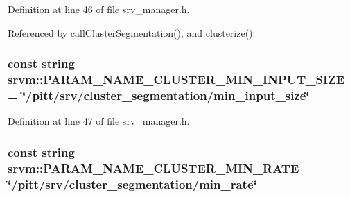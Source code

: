 Definition at line 46 of file srv\-\_\-manager.\-h.



Referenced by call\-Cluster\-Segmentation(), and clusterize().

\hypertarget{namespacesrvm_a3f21a743638bc9a2a5fbfbc5711e4095}{
\subsubsection[{P\-A\-R\-A\-M\-\_\-\-N\-A\-M\-E\-\_\-\-C\-L\-U\-S\-T\-E\-R\-\_\-\-M\-I\-N\-\_\-\-I\-N\-P\-U\-T\-\_\-\-S\-I\-Z\-E}]{\setlength{\rightskip}{0pt plus 5cm}const string srvm\-::\-P\-A\-R\-A\-M\-\_\-\-N\-A\-M\-E\-\_\-\-C\-L\-U\-S\-T\-E\-R\-\_\-\-M\-I\-N\-\_\-\-I\-N\-P\-U\-T\-\_\-\-S\-I\-Z\-E = \char`\"{}/pitt/srv/cluster\-\_\-segmentation/min\-\_\-input\-\_\-size\char`\"{}}}\label{namespacesrvm_a3f21a743638bc9a2a5fbfbc5711e4095}


Definition at line 47 of file srv\-\_\-manager.\-h.

\hypertarget{namespacesrvm_a68216326c13293ff70084f03bb4efa98}{
\subsubsection[{P\-A\-R\-A\-M\-\_\-\-N\-A\-M\-E\-\_\-\-C\-L\-U\-S\-T\-E\-R\-\_\-\-M\-I\-N\-\_\-\-R\-A\-T\-E}]{\setlength{\rightskip}{0pt plus 5cm}const string srvm\-::\-P\-A\-R\-A\-M\-\_\-\-N\-A\-M\-E\-\_\-\-C\-L\-U\-S\-T\-E\-R\-\_\-\-M\-I\-N\-\_\-\-R\-A\-T\-E = \char`\"{}/pitt/srv/cluster\-\_\-segmentation/min\-\_\-rate\char`\"{}}}\label{namespacesrvm_a68216326c13293ff70084f03bb4efa98}



